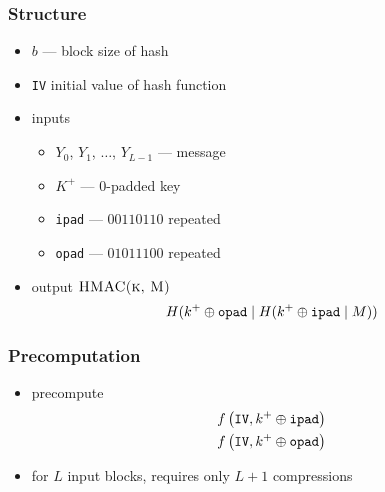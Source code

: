 \documentclass[draft]{article}
\begin{document}
\subsubsection*{Structure}
\begin{itemize}[nosep]
    \item $b$ --- block size of hash
    \item \texttt{IV} initial value of hash function
    \item inputs
          \begin{itemize}[nosep]
              \item $Y_0$, $Y_1$, $\dots$, $Y_{L-1}$ --- message
              \item $K^+$ --- 0-padded key
              \item \texttt{ipad} --- $00110110$ repeated
              \item \texttt{opad} --- $01011100$ repeated
          \end{itemize}
    \item output $\textproc{HMAC(k, M)}$\[H(k^+ \oplus \texttt{opad} \mid H(k^+ \oplus \texttt{ipad} \mid M))\]
\end{itemize}
\subsubsection*{Precomputation}
\begin{itemize}[nosep]
    \item precompute
          \begin{align*}
               & f\left(\texttt{IV}, k^+ \oplus \texttt{ipad}\right) \\
               & f\left(\texttt{IV}, k^+ \oplus \texttt{opad}\right)
          \end{align*}
    \item for $L$ input blocks, requires only $L+1$ compressions
\end{itemize}
\end{document}
